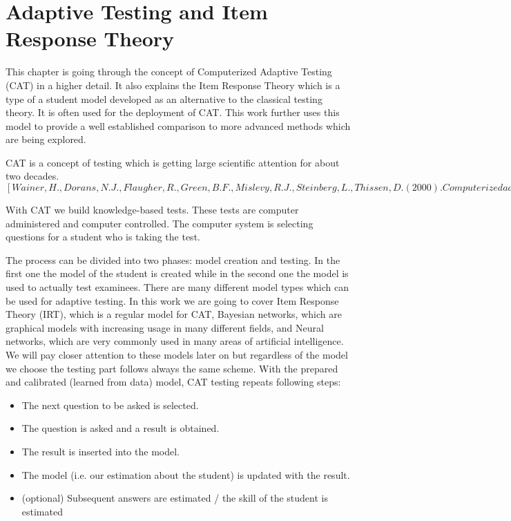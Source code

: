 \chapter{Adaptive Testing and Item Response Theory }
This chapter is going through the concept of Computerized Adaptive Testing (CAT) in a higher detail. It also explains the Item Response Theory which is a type of a student model developed as an alternative to the classical testing theory. It is often used for the deployment of CAT. This work further uses this model to provide a well established comparison to more advanced methods which are being explored.

CAT is a concept of testing which is getting large scientific attention for about two decades. 
$[Wainer, H., Dorans, N. J., Flaugher, R., Green, B. F., Mislevy, R. J., Steinberg, L., Thissen, D. (2000). Computerized adaptive testing: A primer (2nd ed.). Mahwah: Lawrence Erlbaum.
van der Linden, W. J., Glas, C. A. W. (2010). Elements of adaptive testing. New York: Springer.
van der Linden, Wim J., Glas, Cees A. W. (Eds.), Computerized Adaptive Testing: Theory and Practice].$

With CAT we build knowledge-based tests. These tests are computer administered and computer controlled. The computer system is selecting questions for a student who is taking the test. 


The process can be divided into two phases: model creation and testing. In the first one the model of the student is created while in the second one the model is used to actually test examinees. There are many different model types which can be used for adaptive testing. In this work we are going to cover Item Response Theory (IRT), which is a regular model for CAT, Bayesian networks, which are graphical models with increasing usage in many different fields, and Neural networks, which are very commonly used in many areas of artificial intelligence. We will pay closer attention to these models later on but regardless of the model we choose the testing part follows always the same scheme. With the prepared and calibrated (learned from data) model, CAT testing repeats following steps:

\label{sec:CATprocess}
\begin{itemize}
	\item The next question to be asked is selected.
	\item The question is asked and a result is obtained.
	\item The result is inserted into the model.
	\item The model (i.e. our estimation about the student) is updated with the result.
	\item (optional) Subsequent answers are estimated / the skill of the student is estimated
\end{itemize}

